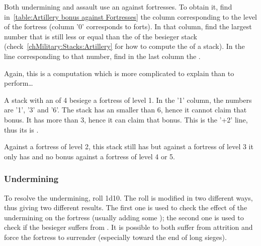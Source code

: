 
\smallskip

Both undermining and assault use an  against
fortresses. To obtain it, find in~\ref{table:Artillery bonus against
  Fortresses} the column corresponding to the level of the fortress (column
'0' corresponds to forts). In that column, find the largest number that is
still less or equal than the  of the besieger stack
(check~\ref{chMilitary:Stacks:Artillery} for how to compute the
 of a stack). In the line corresponding to that number,
find in the last column the .


\begin{exemple}
  Again, this is a computation which is more complicated to explain than to
  perform\ldots

  A stack with an  of 4 besiege a fortress of level
  1. In the '1' column, the numbers are '1', '3' and '6'. The stack has an
   smaller than 6, hence it cannot claim that bonus. It
  has more than 3, hence it can claim that bonus. This is the '+2' line, thus
  its  is .

  Against a fortress of level 2, this stack still has  but against a
  fortress of level 3 it only has  and no bonus against a fortress
  of level 4 or 5.
\end{exemple}

\subsubsection{Undermining}
To resolve the undermining, roll 1d10. The roll is modified in two different
ways, thus giving two different results. The first one is used to check the
effect of the undermining on the fortress (usually adding some \USURE); the
second one is used to check if the besieger suffers from . It is possible to both suffer from attrition and force the
fortress to surrender (especially toward the end of long sieges).

